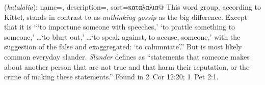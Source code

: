 \item[Slander,]

(\textit{katalalia}):
{
    name=,
    description={},
    sort=καταλαλια@
}
This word group, according to Kittel, stands in contrast to  as \emph{unthinking gossip} as the big difference. Except that it is ```to importune someone with speeches,' `to prattle something to someone,' \ldots `to blurt out,' \ldots `to speak against, to accuse, someone,' with the suggestion of the false and exaggregated: `to calumniate'.''
 But is most likely common everyday slander. \emph{Slander} defines as ``statements that someone makes about another person that are not true and that harm their reputation, or the crime of making these statements.''
Found in 2~Cor 12:20; 1~Pet 2:1.
